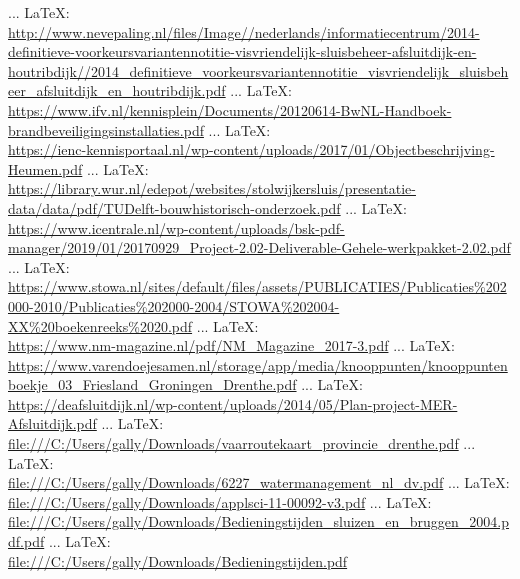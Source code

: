 \begin{thebibliography}{99}
{{ ... \LaTeX:\\ \url{http://www.nevepaling.nl/files/Image//nederlands/informatiecentrum/2014-definitieve-voorkeursvariantennotitie-visvriendelijk-sluisbeheer-afsluitdijk-en-houtribdijk//2014_definitieve_voorkeursvariantennotitie_visvriendelijk_sluisbeheer_afsluitdijk_en_houtribdijk.pdf}
 ... \LaTeX:\\ \url{https://www.ifv.nl/kennisplein/Documents/20120614-BwNL-Handboek-brandbeveiligingsinstallaties.pdf}
 ... \LaTeX:\\ \url{https://ienc-kennisportaal.nl/wp-content/uploads/2017/01/Objectbeschrijving-Heumen.pdf}
 ... \LaTeX:\\ \url{https://library.wur.nl/edepot/websites/stolwijkersluis/presentatie-data/data/pdf/TUDelft-bouwhistorisch-onderzoek.pdf}
 ... \LaTeX:\\ \url{https://www.icentrale.nl/wp-content/uploads/bsk-pdf-manager/2019/01/20170929_Project-2.02-Deliverable-Gehele-werkpakket-2.02.pdf}
 ... \LaTeX:\\ \url{https://www.stowa.nl/sites/default/files/assets/PUBLICATIES/Publicaties%202000-2010/Publicaties%202000-2004/STOWA%202004-XX%20boekenreeks%2020.pdf}
 ... \LaTeX:\\ \url{https://www.nm-magazine.nl/pdf/NM_Magazine_2017-3.pdf}
 ... \LaTeX:\\ \url{https://www.varendoejesamen.nl/storage/app/media/knooppunten/knooppuntenboekje_03_Friesland_Groningen_Drenthe.pdf}
 ... \LaTeX:\\ \url{https://deafsluitdijk.nl/wp-content/uploads/2014/05/Plan-project-MER-Afsluitdijk.pdf}
 ... \LaTeX:\\ \url{file:///C:/Users/gally/Downloads/vaarroutekaart_provincie_drenthe.pdf}
 ... \LaTeX:\\ \url{file:///C:/Users/gally/Downloads/6227_watermanagement_nl_dv.pdf}
 ... \LaTeX:\\ \url{file:///C:/Users/gally/Downloads/applsci-11-00092-v3.pdf}
 ... \LaTeX:\\ \url{file:///C:/Users/gally/Downloads/Bedieningstijden_sluizen_en_bruggen_2004.pdf.pdf}
 ... \LaTeX:\\ \url{file:///C:/Users/gally/Downloads/Bedieningstijden.pdf}
}}
\end{thebibliography}
